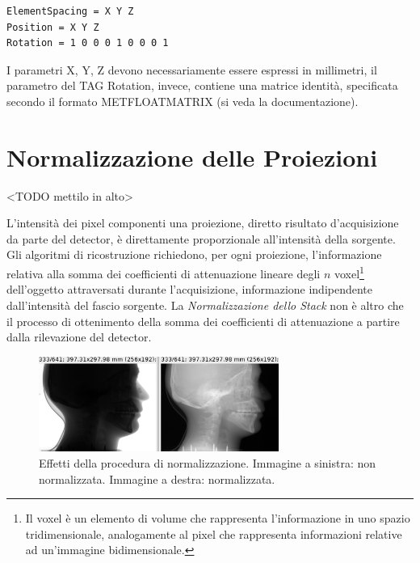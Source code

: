 \documentclass[a4paper,12pt, doubleside]{report}
\begin{document}
                    \begin{lstlisting}[language=bash, frame=bt]
ElementSpacing = X Y Z
Position = X Y Z
Rotation = 1 0 0 0 1 0 0 0 1
                    \end{lstlisting}
                    
                    I parametri X, Y, Z devono necessariamente essere espressi in millimetri, il parametro del TAG Rotation, invece, contiene una matrice identità, specificata secondo il formato MET\textunderscore FLOAT\textunderscore MATRIX (si veda la documentazione).
                    
            
        \section{Normalizzazione delle Proiezioni}
            <TODO mettilo in alto>
            \par
                L'intensità dei pixel componenti una proiezione, diretto risultato d'acquisizione da parte del detector, è direttamente proporzionale all'intensità della sorgente. Gli algoritmi di ricostruzione richiedono, per ogni proiezione, l'informazione relativa alla somma dei coefficienti di attenuazione lineare degli $n$ voxel\footnote{Il voxel è un elemento di volume che rappresenta l'informazione in uno spazio tridimensionale, analogamente al pixel che rappresenta informazioni relative ad un'immagine bidimensionale.} dell'oggetto attraversati durante l'acquisizione, informazione indipendente dall'intensità del fascio sorgente. La \textit{Normalizzazione dello Stack} non è altro che il processo di ottenimento della somma dei coefficienti di attenuazione a partire dalla rilevazione del detector.
          
                \begin{figure}[h]
                    \centering
                    \includegraphics[width=0.7\textwidth]{normalization}
                    \caption{Effetti della procedura di normalizzazione. Immagine a sinistra: non normalizzata. Immagine a destra: normalizzata.}
                    \label{fig:skull-phantom}
                \end{figure}
                
\end{document}
